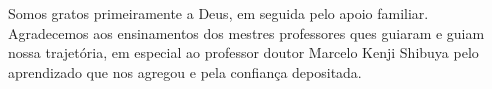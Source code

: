 \begin{agradecimentos}
Somos gratos primeiramente a Deus, em seguida pelo apoio familiar. Agradecemos aos ensinamentos dos mestres professores ques guiaram e guiam nossa trajetória, em especial ao professor doutor Marcelo Kenji Shibuya pelo aprendizado que nos agregou e pela confiança depositada. 
\end{agradecimentos}
